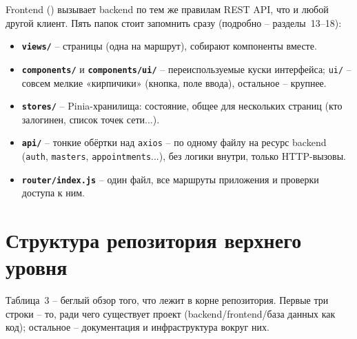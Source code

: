 Frontend () вызывает backend по тем же правилам
REST API, что и любой другой клиент. Пять папок стоит запомнить сразу
(подробно -- разделы~13--18):

\begin{itemize}
  \item \textbf{\texttt{views/}} -- страницы (одна на маршрут), собирают
        компоненты вместе.
  \item \textbf{\texttt{components/}} и \textbf{\texttt{components/ui/}}
        -- переиспользуемые куски интерфейса; \texttt{ui/} -- совсем
        мелкие «кирпичики» (кнопка, поле ввода), остальное -- крупнее.
  \item \textbf{\texttt{stores/}} -- Pinia-хранилища: состояние,
        общее для нескольких страниц (кто залогинен, список точек сети...).
  \item \textbf{\texttt{api/}} -- тонкие обёртки над \texttt{axios} --
        по одному файлу на ресурс backend (\texttt{auth}, \texttt{masters},
        \texttt{appointments}...), без логики внутри, только HTTP-вызовы.
  \item \textbf{\texttt{router/index.js}} -- один файл, все маршруты
        приложения и проверки доступа к ним.
\end{itemize}

\section{Структура репозитория верхнего уровня}

Таблица~3 -- беглый обзор того, что лежит в корне репозитория. Первые
три строки -- то, ради чего существует проект (backend/frontend/база
данных как код); остальное -- документация и инфраструктура вокруг них.

